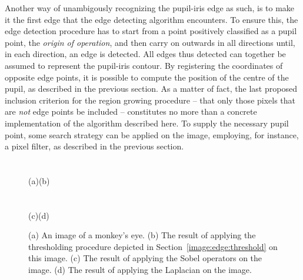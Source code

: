 Another way of unambigously recognizing the pupil-iris edge as such,
is to make it the first edge that the edge detecting algorithm
encounters.  To ensure this, the edge detection procedure has to start
from a point positively classified as a pupil point, the {\em origin
  of operation\/}, and then carry on outwards in all directions until,
in each direction, an edge is detected.  All edges thus detected can
together be assumed to represent the pupil-iris contour.  By
registering the coordinates of opposite edge points, it is possible to
compute the position of the centre of the pupil, as described in the
previous section.  As a matter of fact, the last proposed inclusion
criterion for the region growing procedure -- that only those pixels
that are {\em not\/} edge points be included -- constitutes no more
than a concrete implementation of the algorithm described here.  To
supply the necessary pupil point, some search strategy can be applied
on the image, employing, for instance, a pixel filter, as described in
the previous section.

\begin{figure}[tb]
  \textwidth
  \paragraph{}
  \\
  \hspace*{0.28\textwidth}(a)\hspace*{0.38\textwidth}(b)
  \paragraph{}
  \\
  \hspace*{0.28\textwidth}(c)\hspace*{0.38\textwidth}(d)
  \caption{\label{fig:compare}(a) An image of a monkey's eye.  (b) The
    result of applying the thresholding procedure depicted in
    Section~\protect\ref{image:edge:threshold} on this image.  (c) The
    result of applying the Sobel operators on the image.  (d) The
    result of applying the Laplacian on the image.}
\end{figure}

